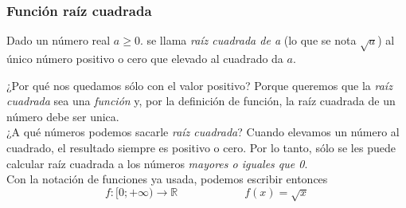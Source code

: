 \documentclass[Análisis.root.tex]{subfiles}
\newcommand{\R}{\mathbb{R}}
\begin{document}
        \subsubsection{Función raíz cuadrada}
        Dado un número real \(a\geq0\). se llama \textit{raíz cuadrada de a} (lo que se nota \(\sqrt{a}\)) al único número positivo o cero que elevado al cuadrado da \(a\).
        \begin{center}
        \end{center}
        ¿Por qué nos quedamos sólo con el valor positivo? Porque queremos que la \textit{raíz cuadrada} sea una \textit{función} y, por la definición de función, la raíz cuadrada de un número debe ser unica.\\
        ¿A qué números podemos sacarle \textit{raíz cuadrada}? Cuando elevamos un número al cuadrado, el resultado siempre es positivo o cero. Por lo tanto, sólo se les puede calcular raíz cuadrada a los números \textit{mayores o iguales que 0}.\\
        Con la notación de funciones ya usada, podemos escribir entonces
        \[f:[0;+\infty)\rightarrow\R \qquad\qquad\qquad f(x)=\sqrt{x}\]
\end{document}
